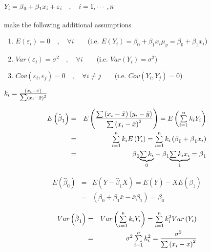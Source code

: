 \documentclass{article}
\begin{document}
\paragraph{$Y_{i}=\protect\beta _{0}+\protect\beta _{1}x_{i}+\protect%
\varepsilon _{i}\quad ,\quad i=1,\cdots ,n$}

make the following additional assumptions

\begin{enumerate}
\item $E\left( \varepsilon _{i}\right) =0\quad ,\quad \forall i\qquad $(i.e. 
$E\left( Y_{i}\right) =\beta _{0}+\beta _{1}x_{i}$\quad $\mu _{y}=\beta
_{0}+\beta _{1}x_{i}$)

\item $Var\left( \varepsilon _{i}\right) =\sigma ^{2}\quad ,\quad \forall
i\qquad $(i.e. $Var\left( Y_{i}\right) =\sigma ^{2}$)

\item $Cov\left( \varepsilon _{i},\varepsilon _{j}\right) =0\quad ,\quad
\forall i\neq j\qquad $(i.e. $Cov\left( Y_{i},Y_{j}\right) =0$)
\end{enumerate}

\bigskip 

$k_{i}=\frac{\left( x_{i}-\bar{x}\right) }{\mathop{\textstyle \sum } \left( x_{i}-\bar{x}\right)
^{2}}$

\begin{eqnarray*}
E\left( \hat{\beta}_{1}\right)  &=&E\left( \frac{\tsum \left( x_{i}-\bar{x}%
\right) \left( y_{i}-\bar{y}\right) }{\tsum \left( x_{i}-\bar{x}\right) ^{2}}%
\right) =E\left( \tsum\limits_{i=1}^{n}k_{i}Y_{i}\right)  \\
&=&\tsum\limits_{i=1}^{n}k_{i}E\left( Y_{i}\right)
=\tsum\limits_{i=1}^{n}k_{i}\left( \beta _{0}+\beta _{1}x_{i}\right)  \\
&=&\beta _{0}\underset{0}{\underbrace{\tsum k_{i}}}+\beta _{1}\underset{1}{%
\underbrace{\tsum k_{i}x_{i}}}=\beta _{1}
\end{eqnarray*}

\bigskip 

\begin{eqnarray*}
E\left( \hat{\beta}_{0}\right)  &=&E\left( \bar{Y}-\hat{\beta}_{1}\bar{X}%
\right) =E\left( \bar{Y}\right) -\bar{X}E\left( \hat{\beta}_{1}\right)  \\
&=&\left( \beta _{0}+\beta _{1}\bar{x}-\bar{x}\beta _{1}\right) =\beta _{0}
\end{eqnarray*}

\begin{eqnarray*}
Var\left( \hat{\beta}_{1}\right)  &=&Var\left(
\tsum\limits_{i=1}^{n}k_{i}Y_{i}\right)
=\tsum\limits_{i=1}^{n}k_{i}^{2}Var\left( Y_{i}\right)  \\
&=&\sigma ^{2}\tsum\limits_{i=1}^{n}k_{i}^{2}=\frac{\sigma ^{2}}{\tsum
\left( x_{i}-\bar{x}\right) ^{2}}
\end{eqnarray*}
\end{document}
